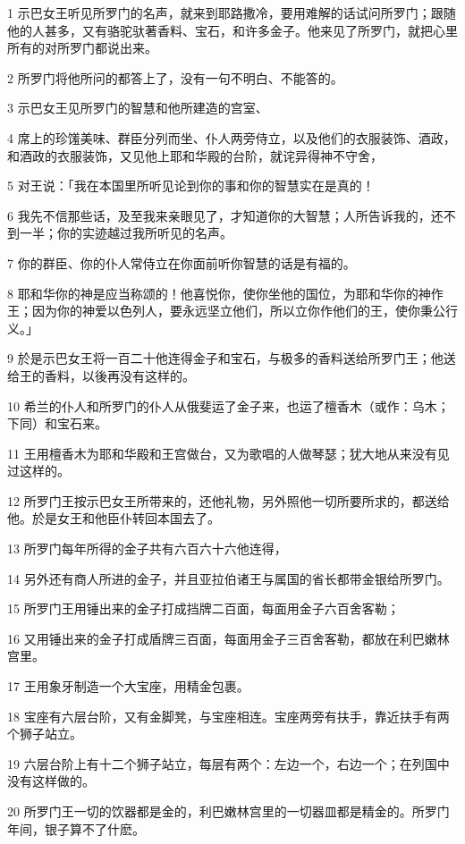 \par 1 示巴女王听见所罗门的名声，就来到耶路撒冷，要用难解的话试问所罗门；跟随他的人甚多，又有骆驼驮著香料、宝石，和许多金子。他来见了所罗门，就把心里所有的对所罗门都说出来。
\par 2 所罗门将他所问的都答上了，没有一句不明白、不能答的。
\par 3 示巴女王见所罗门的智慧和他所建造的宫室、
\par 4 席上的珍馐美味、群臣分列而坐、仆人两旁侍立，以及他们的衣服装饰、酒政，和酒政的衣服装饰，又见他上耶和华殿的台阶，就诧异得神不守舍，
\par 5 对王说：「我在本国里所听见论到你的事和你的智慧实在是真的！
\par 6 我先不信那些话，及至我来亲眼见了，才知道你的大智慧；人所告诉我的，还不到一半；你的实迹越过我所听见的名声。
\par 7 你的群臣、你的仆人常侍立在你面前听你智慧的话是有福的。
\par 8 耶和华你的神是应当称颂的！他喜悦你，使你坐他的国位，为耶和华你的神作王；因为你的神爱以色列人，要永远坚立他们，所以立你作他们的王，使你秉公行义。」
\par 9 於是示巴女王将一百二十他连得金子和宝石，与极多的香料送给所罗门王；他送给王的香料，以後再没有这样的。
\par 10 希兰的仆人和所罗门的仆人从俄斐运了金子来，也运了檀香木（或作：乌木；下同）和宝石来。
\par 11 王用檀香木为耶和华殿和王宫做台，又为歌唱的人做琴瑟；犹大地从来没有见过这样的。
\par 12 所罗门王按示巴女王所带来的，还他礼物，另外照他一切所要所求的，都送给他。於是女王和他臣仆转回本国去了。
\par 13 所罗门每年所得的金子共有六百六十六他连得，
\par 14 另外还有商人所进的金子，并且亚拉伯诸王与属国的省长都带金银给所罗门。
\par 15 所罗门王用锤出来的金子打成挡牌二百面，每面用金子六百舍客勒；
\par 16 又用锤出来的金子打成盾牌三百面，每面用金子三百舍客勒，都放在利巴嫩林宫里。
\par 17 王用象牙制造一个大宝座，用精金包裹。
\par 18 宝座有六层台阶，又有金脚凳，与宝座相连。宝座两旁有扶手，靠近扶手有两个狮子站立。
\par 19 六层台阶上有十二个狮子站立，每层有两个：左边一个，右边一个；在列国中没有这样做的。
\par 20 所罗门王一切的饮器都是金的，利巴嫩林宫里的一切器皿都是精金的。所罗门年间，银子算不了什麽。
